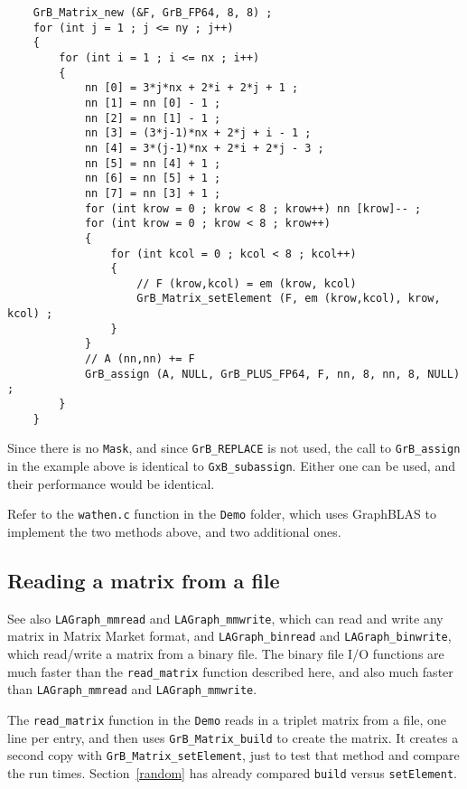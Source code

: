 \documentclass[12pt]{article}
\begin{document}
{    {\footnotesize
    \begin{verbatim}
    GrB_Matrix_new (&F, GrB_FP64, 8, 8) ;
    for (int j = 1 ; j <= ny ; j++)
    {
        for (int i = 1 ; i <= nx ; i++)
        {
            nn [0] = 3*j*nx + 2*i + 2*j + 1 ;
            nn [1] = nn [0] - 1 ;
            nn [2] = nn [1] - 1 ;
            nn [3] = (3*j-1)*nx + 2*j + i - 1 ;
            nn [4] = 3*(j-1)*nx + 2*i + 2*j - 3 ;
            nn [5] = nn [4] + 1 ;
            nn [6] = nn [5] + 1 ;
            nn [7] = nn [3] + 1 ;
            for (int krow = 0 ; krow < 8 ; krow++) nn [krow]-- ;
            for (int krow = 0 ; krow < 8 ; krow++)
            {
                for (int kcol = 0 ; kcol < 8 ; kcol++)
                {
                    // F (krow,kcol) = em (krow, kcol)
                    GrB_Matrix_setElement (F, em (krow,kcol), krow, kcol) ;
                }
            }
            // A (nn,nn) += F
            GrB_assign (A, NULL, GrB_PLUS_FP64, F, nn, 8, nn, 8, NULL) ;
        }
    } \end{verbatim}}

Since there is no \verb'Mask', and since \verb'GrB_REPLACE' is not used, the call
to \verb'GrB_assign' in the example above is identical to \verb'GxB_subassign'.
Either one can be used, and their performance would be identical.

Refer to the \verb'wathen.c' function in the \verb'Demo' folder, which
uses GraphBLAS to implement the two methods above, and two additional ones.

\subsection{Reading a matrix from a file}
\label{read}

See also \verb'LAGraph_mmread' and \verb'LAGraph_mmwrite', which
can read and write any matrix in Matrix Market format, and
\verb'LAGraph_binread' and \verb'LAGraph_binwrite', which read/write a matrix
from a binary file.  The binary file I/O functions are much faster than
the \verb'read_matrix' function described here, and also much faster than
\verb'LAGraph_mmread' and \verb'LAGraph_mmwrite'.

The \verb'read_matrix' function in the \verb'Demo' reads in a triplet matrix
from a file, one line per entry, and then uses \verb'GrB_Matrix_build' to
create the matrix.  It creates a second copy with \verb'GrB_Matrix_setElement',
just to test that method and compare the run times.
Section~\ref{random} has already compared
\verb'build' versus \verb'setElement'.

}
\end{document}
